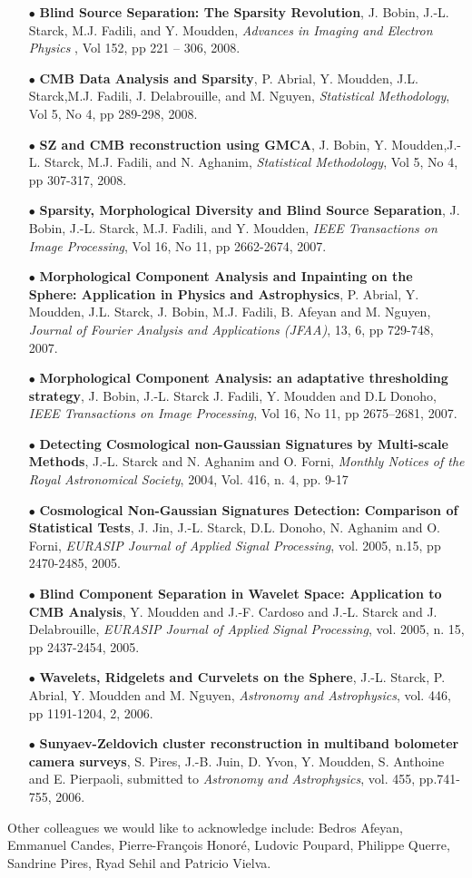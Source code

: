 \begin{itemize}
\item[$\bullet$] {\textbf{Blind Source Separation: The Sparsity Revolution}, J. Bobin, J.-L. Starck, M.J. Fadili, and Y. Moudden, \textit{Advances in Imaging and Electron Physics }, Vol 152, pp 221 -- 306, 2008.}
\item[$\bullet$] {\textbf{CMB Data Analysis and Sparsity}, P. Abrial, Y. Moudden, J.L. Starck,M.J. Fadili, J. Delabrouille, and M. Nguyen, \textit{Statistical Methodology}, Vol 5, No 4, pp 289-298, 2008.}
\item[$\bullet$] {\textbf{SZ and CMB reconstruction using GMCA}, J. Bobin, Y. Moudden,J.-L. Starck, M.J. Fadili, and N. Aghanim, \textit{Statistical Methodology}, Vol 5, No 4, pp 307-317, 2008.}
\item[$\bullet$] {\textbf{Sparsity, Morphological Diversity and Blind Source Separation}, J. Bobin, J.-L. Starck, M.J. Fadili, and Y. Moudden, \textit{IEEE Transactions on Image Processing}, Vol 16, No 11, pp 2662-2674, 2007.}
\item[$\bullet$] {\textbf{Morphological Component Analysis and Inpainting on the Sphere: Application in Physics and Astrophysics}, P. Abrial, Y. Moudden, J.L. Starck, J. Bobin, M.J. Fadili, B. Afeyan and M. Nguyen,  \textit{Journal of Fourier Analysis and Applications (JFAA)}, 13, 6, pp 729-748, 2007.}
\item[$\bullet$] {\textbf{Morphological Component Analysis: an adaptative thresholding strategy}, J. Bobin, J.-L. Starck J. Fadili, Y. Moudden and D.L Donoho, \textit{IEEE Transactions on Image Processing}, Vol 16, No 11, pp 2675--2681, 2007.}
\item[$\bullet$] {\textbf{Detecting Cosmological non-Gaussian Signatures by Multi-scale Methods}, J.-L. Starck and N. Aghanim and O. Forni, \textit{Monthly Notices of the Royal Astronomical Society}, 2004, Vol. 416, n. 4, pp. 9-17}
\item[$\bullet$] {\textbf{Cosmological Non-Gaussian Signatures Detection: Comparison of Statistical Tests}, J. Jin, J.-L. Starck, D.L. Donoho, N. Aghanim and O. Forni, \textit{EURASIP Journal of Applied Signal Processing}, vol. 2005, n.15, pp 2470-2485, 2005.}
\item[$\bullet$] {\textbf{Blind Component Separation in Wavelet Space: Application to {CMB} Analysis}, Y. Moudden and J.-F. Cardoso and J.-L. Starck and J. Delabrouille, \textit{EURASIP Journal of Applied Signal Processing}, vol. 2005, n. 15, pp 2437-2454, 2005.}
\item[$\bullet$] {\textbf{Wavelets, Ridgelets and Curvelets on the Sphere}, J.-L. Starck, P. Abrial, Y. Moudden and M. Nguyen, \textit{Astronomy and Astrophysics}, vol. 446, pp 1191-1204, 2, 2006.}
\item[$\bullet$] {\textbf{Sunyaev-Zeldovich cluster reconstruction in multiband bolometer camera surveys}, S. Pires, J.-B. Juin, D. Yvon, Y. Moudden, S. Anthoine and E. Pierpaoli, submitted to \textit{Astronomy and Astrophysics}, vol. 455,  pp.741-755, 2006.}
\end{itemize}
Other colleagues we would like to acknowledge include:
Bedros Afeyan, Emmanuel Candes, Pierre-Fran{\c{c}}ois Honor\'e, Ludovic Poupard, Philippe Querre, Sandrine Pires, Ryad Sehil and Patricio Vielva.

\newpage
\thispagestyle{empty}
$ $
\newpage


